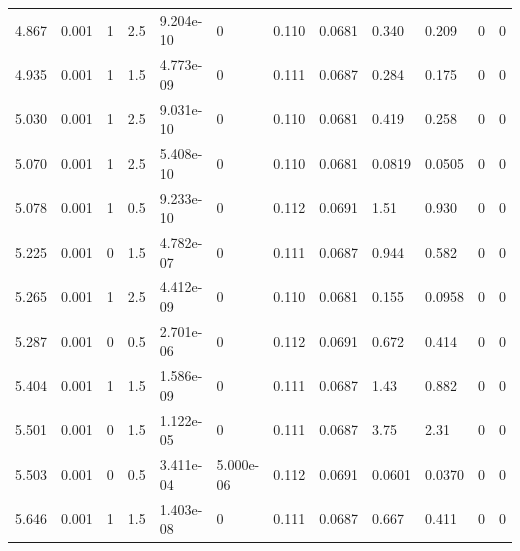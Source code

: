 \documentclass[preview]{standalone}
\begin{document}
{{{\begin{tabular}{L{1.2cm}C{1.2cm} C{0.3cm}C{0.5cm} C{1.4cm}C{1.4cm} C{1.4cm}C{1.4cm} C{1.6cm}C{1.6cm} C{1.6cm}C{1.6cm}}
  4.867  &  0.001  & 1     & 2.5 &  9.204e-10  & 0  &  0.110&   0.0681& 0.340 & 0.209   &  0 & 0  \\ 
  4.935  &  0.001  & 1     & 1.5 &  4.773e-09  & 0  &  0.111&   0.0687& 0.284 & 0.175   &  0 & 0  \\ 
  5.030  &  0.001  & 1     & 2.5 &  9.031e-10  & 0  &  0.110&   0.0681& 0.419 & 0.258   &  0 & 0  \\ 
  5.070  &  0.001  & 1     & 2.5 &  5.408e-10  & 0  &  0.110&   0.0681& 0.0819 & 0.0505   &  0 & 0  \\ 
  5.078  &  0.001  & 1     & 0.5 &  9.233e-10  & 0  &  0.112&   0.0691& 1.51 & 0.930   &  0 & 0  \\ 
  5.225  &  0.001  & 0     & 1.5 &  4.782e-07  & 0  &  0.111&   0.0687& 0.944 & 0.582   &  0 & 0  \\ 
  5.265  &  0.001  & 1     & 2.5 &  4.412e-09  & 0  &  0.110&   0.0681& 0.155 & 0.0958   &  0 & 0  \\ 
  5.287  &  0.001  & 0     & 0.5 &  2.701e-06  & 0  &  0.112&   0.0691& 0.672 & 0.414   &  0 & 0  \\ 
  5.404  &  0.001  & 1     & 1.5 &  1.586e-09  & 0  &  0.111&   0.0687& 1.43 & 0.882   &  0 & 0  \\ 
  5.501  &  0.001  & 0     & 1.5 &  1.122e-05  & 0  &  0.111&   0.0687& 3.75 & 2.31   &  0 & 0  \\ 
  5.503  &  0.001  & 0     & 0.5 &  3.411e-04  & 5.000e-06  &  0.112&   0.0691& 0.0601 & 0.0370   &  0 & 0  \\ 
  5.646  &  0.001  & 1     & 1.5 &  1.403e-08  & 0  &  0.111&   0.0687& 0.667 & 0.411   &  0 & 0  \\ 
\hline 
\end{tabular} 

}}}
\end{document}
